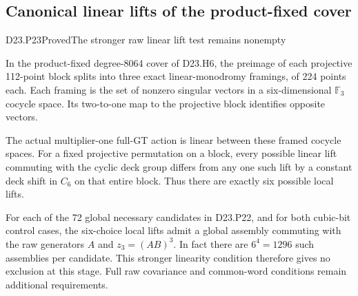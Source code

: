 \subsection{Canonical linear lifts of the product-fixed cover}

\begin{statement}{D23.P23}{Proved}{The stronger raw linear lift test remains nonempty}
\end{statement}
In the product-fixed degree-8064 cover of D23.H6, the
preimage of each projective 112-point block splits into
three exact linear-monodromy framings, of 224 points each.
Each framing is the set of nonzero singular vectors in a
six-dimensional $\mathbb F_3$ cocycle space. Its two-to-one
map to the projective block identifies opposite vectors.

The actual multiplier-one full-GT action is linear between
these framed cocycle spaces. For a fixed projective
permutation on a block, every possible linear lift commuting
with the cyclic deck group differs from any one such lift
by a constant deck shift in $C_6$ on that entire block.
Thus there are exactly six possible local lifts.

For each of the 72 global necessary candidates in D23.P22,
and for both cubic-bit control cases, the six-choice local
lifts admit a global assembly commuting with the raw
generators $A$ and $z_3=(AB)^3$. In fact there are
$6^4=1296$ such assemblies per candidate. This stronger
linearity condition therefore gives no exclusion at this
stage. Full raw covariance and common-word conditions
remain additional requirements.


